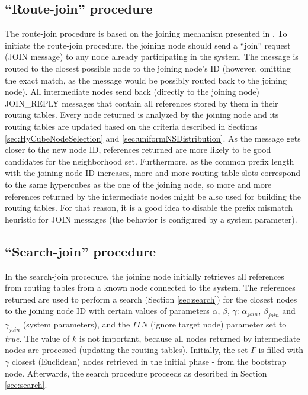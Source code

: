 \subsection{``Route-join'' procedure}

The route-join procedure is based on the joining mechanism presented in \cite{pastry}. To initiate the route-join procedure, the joining node should send a ``join'' request (JOIN message) to any node already participating in the system. The message is routed to the closest possible node to the joining node's ID (however, omitting the exact match, as the message would be possibly routed back to the joining node). All intermediate nodes send back (directly to the joining node) JOIN\_REPLY messages that contain all references stored by them in their routing tables. Every node returned is analyzed by the joining node and its routing tables are updated based on the criteria described in Sections \ref{sec:HyCubeNodeSelection} and \ref{sec:uniformNSDistribution}. As the message gets closer to the new node ID, references returned are more likely to be good candidates for the neighborhood set. Furthermore, as the common prefix length with the joining node ID increases, more and more routing table slots correspond to the same hypercubes as the one of the joining node, so more and more references returned by the intermediate nodes might be also used for building the routing tables. For that reason, it is a good idea to disable the prefix mismatch heuristic for JOIN messages (the behavior is configured by a system parameter).




\subsection{``Search-join'' procedure}

In the search-join procedure, the joining node initially retrieves all references from routing tables from a known node connected to the system. The references returned are used to perform a search (Section \ref{sec:search}) for the closest nodes to the joining node ID with certain values of parameters $\alpha$, $\beta$, $\gamma$: $\alpha_{join}$, $\beta_{join}$ and $\gamma_{join}$ (system parameters), and the $ITN$ (ignore target node) parameter set to \emph{true}. The value of $k$ is not important, because all nodes returned by intermediate nodes are processed (updating the routing tables). Initially, the set $\Gamma$ is filled with $\gamma$ closest (Euclidean) nodes retrieved in the initial phase - from the bootstrap node. Afterwards, the search procedure proceeds as described in Section \ref{sec:search}.


